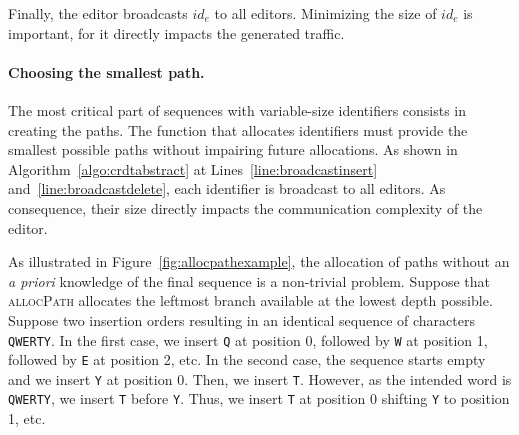 \noindent Finally, the editor broadcasts $id_{e}$ to all editors. Minimizing the
size of $id_e$ is important, for it directly impacts the generated traffic.

\paragraph{Choosing the smallest path.}

The most critical part of sequences with variable-size identifiers consists in
creating the paths. The function that allocates identifiers must provide the
smallest possible paths without impairing future allocations. As shown in
Algorithm~\ref{algo:crdtabstract} at Lines~\ref{line:broadcastinsert}
and~\ref{line:broadcastdelete}, each identifier is broadcast to all editors. As
consequence, their size directly impacts the communication complexity of the
editor.



\begin{figure*}
  \centering
  \hspace{50pt}
  \caption{\label{fig:allocpathexample} Two trees filled with the resulting
    identifiers of two different permutations resulting in an identical sequence
    \texttt{QWERTY}. The function \textsc{allocPath} allocates the leftmost
    branch in the tree. All paths of the optimal case have a length of 1 while
    the tree of the worst case grows up to a depth of 6.}
\end{figure*}

As illustrated in Figure~\ref{fig:allocpathexample}, the allocation of paths
without an \emph{a priori} knowledge of the final sequence is a non-trivial
problem.  Suppose that \textsc{allocPath} allocates the leftmost branch
available at the lowest depth possible. Suppose two insertion orders resulting
in an identical sequence of characters \texttt{QWERTY}.  In the first case, we
insert \texttt{Q} at position 0, followed by \texttt{W} at position 1, followed
by \texttt{E} at position 2, etc.  In the second case, the sequence starts empty
and we insert \texttt{Y} at position 0. Then, we insert \texttt{T}. However, as
the intended word is \texttt{QWERTY}, we insert \texttt{T} before
\texttt{Y}. Thus, we insert \texttt{T} at position 0 shifting \texttt{Y} to
position 1, etc.


